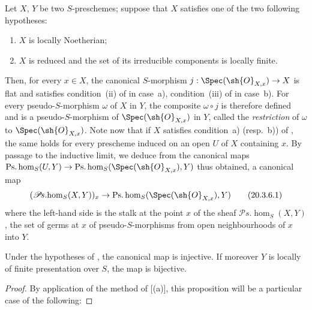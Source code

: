 \begin{env}[20.3.6]
\label{IV.20.3.6}
Let $X$, $Y$ be two $S$-preschemes;
suppose that $X$ satisfies one of the two following hypotheses:
\begin{enumerate}[label=\emph{\alph*)}]
  \item $X$ is locally Noetherian;
  \item $X$ is reduced and the set of its irreducible components is locally finite.
\end{enumerate}
Then, for every $x\in X$, the canonical $S$-morphism $j:\Spec(\sh{O}_{X,x})\to X$ is flat and satisfies condition~(ii) of  in case~a), condition~(iii) of  in case~b).
For every pseudo-$S$-morphism $\omega$ of $X$ in $Y$, the composite $\omega\circ j$ is therefore defined and is a pseudo-$S$-morphism of $\Spec(\sh{O}_{X,x})$ in $Y$, called the \emph{restriction} of $\omega$ to $\Spec(\sh{O}_{X,x})$.
Note now that if $X$ satisfies condition~a) (resp.~b)) of , the same holds for every prescheme induced on an open $U$ of $X$ containing $x$.
By passage to the inductive limit, we deduce from the canonical maps $\operatorname{Ps.hom}_S(U,Y)\to\operatorname{Ps.hom}_S(\Spec(\sh{O}_{X,x}),Y)$ thus obtained, a canonical map
\[
\label{IV.20.3.6.1}
  (\mathscr{P}\!s.\!\operatorname{hom}_S(X,Y))_x\to\operatorname{Ps.hom}_S(\Spec(\sh{O}_{X,x}),Y)
  \tag{20.3.6.1}
\]
where the left-hand side is the stalk at the point $x$ of the sheaf $\mathscr{P}\!s.\!\operatorname{hom}_S(X,Y)$, the set of germs at $x$ of pseudo-$S$-morphisms from open neighbourhoods of $x$ into $Y$.
\end{env}

\begin{proposition}[20.3.7]
\label{IV.20.3.7}
Under the hypotheses of , the canonical map  is injective.
If moreover $Y$ is locally of finite presentation over $S$, the map  is bijective.
\end{proposition}

\begin{proof}
By application of the method of [(a)], this proposition will be a particular case of the following:
\end{proof}

